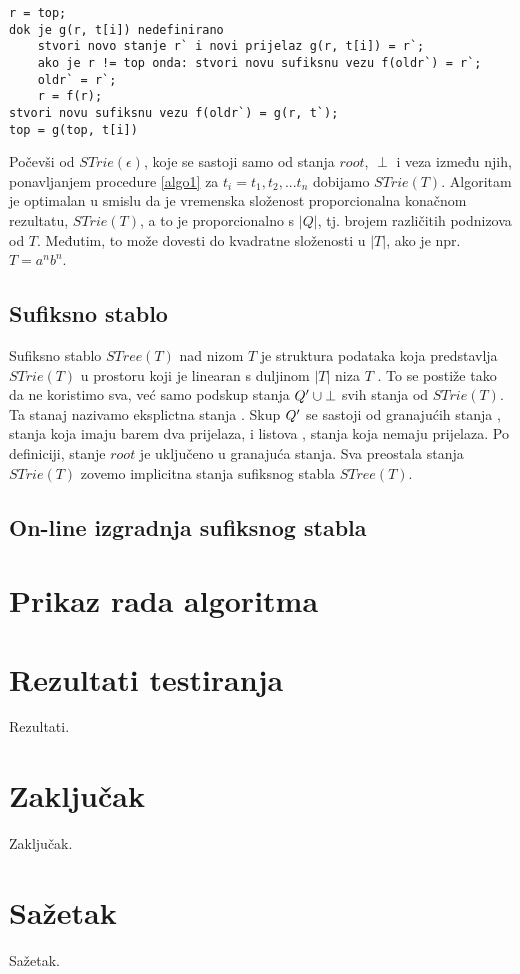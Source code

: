 \documentclass[times, utf8, seminar, numeric]{fer}
\begin{document}
\begin{lstlisting}[caption=Izgradnja $STrie(T^i)$ iz $STrie(T^{i-1})$, label=algo1]
r = top;
dok je g(r, t[i]) nedefinirano
	stvori novo stanje r` i novi prijelaz g(r, t[i]) = r`;
	ako je r != top onda: stvori novu sufiksnu vezu f(oldr`) = r`;
	oldr` = r`;
	r = f(r);
stvori novu sufiksnu vezu f(oldr`) = g(r, t`);
top = g(top, t[i])
\end{lstlisting}
	
	Počevši od $STrie(\epsilon)$, koje se sastoji samo od stanja $root$, $\perp$ i veza između njih, ponavljanjem procedure \ref{algo1} za $t_i = t_1,t_2,...t_n$ dobijamo $STrie(T)$. Algoritam je optimalan u smislu da je vremenska složenost proporcionalna konačnom rezultatu, $STrie(T)$, a to je proporcionalno s $|Q|$, tj. brojem različitih podnizova od $T$. Međutim, to može dovesti do kvadratne složenosti u $|T|$, ako je npr. $T=a^n b^n$.

\section{Sufiksno stablo}
	Sufiksno stablo $STree(T)$ nad nizom $T$ je struktura podataka koja predstavlja $STrie(T)$ u prostoru koji je linearan s duljinom $|T|$ niza $T$ \cite{ukkonen}. To se postiže tako da ne koristimo sva, već samo podskup stanja $Q\rq{} \cup {\perp}$ svih stanja od $STrie(T)$. Ta stanaj nazivamo eksplictna stanja . Skup $Q\rq{}$ se sastoji od granajućih stanja , stanja koja imaju barem dva prijelaza, i listova , stanja koja nemaju prijelaza. Po definiciji, stanje $root$ je uključeno u granajuća stanja. Sva preostala stanja $STrie(T)$ zovemo implicitna stanja  sufiksnog stabla $STree(T)$.
	
	

\section{On-line izgradnja sufiksnog stabla}

\chapter{Prikaz rada algoritma}


\chapter{Rezultati testiranja}
Rezultati.

\chapter{Zaključak}
Zaključak.




\chapter{Sažetak}
Sažetak.
\end{document}
